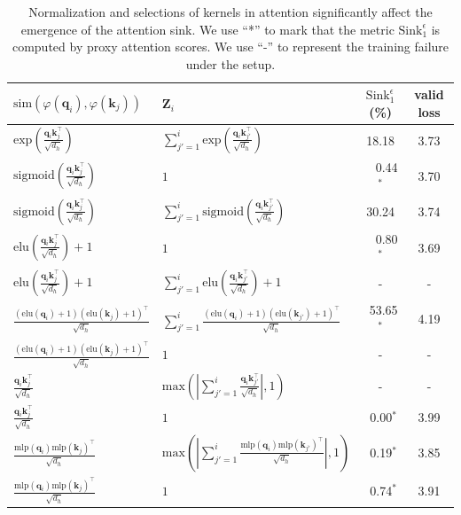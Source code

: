\documentclass{article} \usepackage{iclr2025_conference,times}
\begin{document}
\begin{table}[htbp]
\caption{Normalization and selections of kernels in attention significantly affect the emergence of the attention sink. We use ``*'' to mark that the metric $\textrm{Sink}_1^{\epsilon}$ is computed by proxy attention scores. We use ``-'' to represent the training failure under the setup.}
\vspace{-.2cm}
\begin{center}
\begin{tabular}{l|l|cc}
\toprule
  $\textrm{sim}(\varphi(\boldsymbol{q}_i)\textrm{,}\,\varphi(\boldsymbol{k}_j))$ & $\boldsymbol{Z}_i$ & $\textrm{Sink}_1^{\epsilon}$(\%) & valid loss \\
\midrule
 $\textrm{exp}(\frac{\boldsymbol{q}_i\boldsymbol{k}_j^\top}{\sqrt{d_h}})$ & $\sum_{j'=1}^i \textrm{exp}(\frac{\boldsymbol{q}_i\boldsymbol{k}_{j'}^\top}{\sqrt{d_h}})$ & 18.18 & 3.73 \\
 $\textrm{sigmoid}(\frac{\boldsymbol{q}_i\boldsymbol{k}_j^\top}{\sqrt{d_h}})$ & $1$ & \,\,\,\,\,\,0.44$^*$ &  3.70 \\
$\textrm{sigmoid}(\frac{\boldsymbol{q}_i\boldsymbol{k}_j^\top}{\sqrt{d_h}})$ & $\sum_{j'=1}^i \textrm{sigmoid}(\frac{\boldsymbol{q}_i\boldsymbol{k}_{j'}^\top}{\sqrt{d_h}})$ & 30.24 & 3.74 \\
 $\textrm{elu}(\frac{\boldsymbol{q}_i\boldsymbol{k}_j^\top}{\sqrt{d_h}})+1$ & $1$ & \,\,\,\,\,\,0.80$^*$ &  3.69 \\ 
 $\textrm{elu}(\frac{\boldsymbol{q}_i\boldsymbol{k}_{j}^\top}{\sqrt{d_h}})+1$ & $\sum_{j'=1}^i \textrm{elu}(\frac{\boldsymbol{q}_i\boldsymbol{k}_{j'}^\top}{\sqrt{d_h}})+1$ & - & - \\ 
 \midrule
$\frac{(\textrm{elu}(\boldsymbol{q}_i)+1)(\textrm{elu}(\boldsymbol{k}_j)+1)^\top}{\sqrt{d_h}}$ & $\sum_{j'=1}^i\frac{(\textrm{elu}(\boldsymbol{q}_i)+1)(\textrm{elu}(\boldsymbol{k}_{j'})+1)^\top}{\sqrt{d_h}}$ & \,\,\,53.65$^*$ & 4.19\\ 
$\frac{(\textrm{elu}(\boldsymbol{q}_i)+1)(\textrm{elu}(\boldsymbol{k}_j)+1)^\top}{\sqrt{d_h}}$ & $1$ & -  & - \\ 
$\frac{\boldsymbol{q}_i\boldsymbol{k}_{j}^\top}{\sqrt{d_h}}$ &  $\textrm{max}\left(\left|\sum_{j'=1}^i\frac{\boldsymbol{q}_i\boldsymbol{k}_{j'}^\top}{\sqrt{d_h}}\right|\textrm{,}\,1\right)$ & - &  -\\
$\frac{\boldsymbol{q}_i\boldsymbol{k}_{j}^\top}{\sqrt{d_h}}$ & $1$ & \,\,\,0.00$^*$ & 3.99 \\
$\frac{\textrm{mlp}(\boldsymbol{q}_i)\textrm{mlp}(\boldsymbol{k}_j)^\top}{\sqrt{d_h}}$ &  $\textrm{max}\left(\left|\sum_{j'=1}^i\frac{\textrm{mlp}(\boldsymbol{q}_i)\textrm{mlp}(\boldsymbol{k}_{j'})^\top}{\sqrt{d_h}}\right|\textrm{,}\,1\right)$ & \,\,\,0.19$^*$ &  3.85\\
$\frac{\textrm{mlp}(\boldsymbol{q}_i)\textrm{mlp}(\boldsymbol{k}_j)^\top}{\sqrt{d_h}}$ & $1$ & \,\,\,0.74$^*$ & 3.91 \\
\bottomrule
\end{tabular}
\end{center}
\vspace{-.2cm}
\label{appendix_operation}
\end{table} \clearpage
\end{document}
